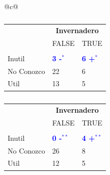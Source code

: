 \documentclass[a4paper, nobind]{templates/ociamthesis}
\begin{document}
\begin{table}
 \centering
  \begin{threeparttable}
  \caption[Asociación entre el factor Invernadero y PPs]{Tablas de contingencia donde el factor Invernadero tuvo una asosiación significativa con alguna PP.}
  \label{tab:invernadero-posthoc}
  \begin{tabular}{@{}c@{}} %
\begin{minipage}{\textwidth}

\begin{subtable}[b]{\textwidth}
\centering

\begin{tabular}{lll}
\toprule
\multicolumn{1}{c}{\textbf{ }} & \multicolumn{2}{c}{\textbf{Invernadero}} \\
  & FALSE & TRUE\\
\midrule
\addlinespace[0.3em]
\multicolumn{3}{l}{\textbf{Agua}}\\
\hspace{1em}Inutil & \textcolor{blue}{\textbf{3 -$^{*}$}} & \textcolor{blue}{\textbf{6 +$^{*}$}}\\
\hspace{1em}No Conozco & 22 & 6\\
\hspace{1em}Util & 13 & 5\\
\bottomrule
\end{tabular}
 \caption{}
 \label{tab:invernadero-agua}
\end{subtable}
\hfill
  
\begin{subtable}[b]{0.4\textwidth}

\begin{tabular}{lll}
\toprule
\multicolumn{1}{c}{\textbf{ }} & \multicolumn{2}{c}{\textbf{Invernadero}} \\
  & FALSE & TRUE\\
\midrule
\addlinespace[0.3em]
\multicolumn{3}{l}{\textbf{Aves}}\\
\hspace{1em}Inutil & \textcolor{blue}{\textbf{0 -$^{**}$}} & \textcolor{blue}{\textbf{4 +$^{**}$}}\\
\hspace{1em}No Conozco & 26 & 8\\
\hspace{1em}Util & 12 & 5\\
\bottomrule
\end{tabular}
  \caption{}
\label{tab:invernadero-aves}
\end{subtable}
\hfill
 \begin{subtable}[b]{0.4\textwidth}


\end{subtable}
\end{minipage}
\end{tabular}
\end{threeparttable}
\end{table}
\end{document}
